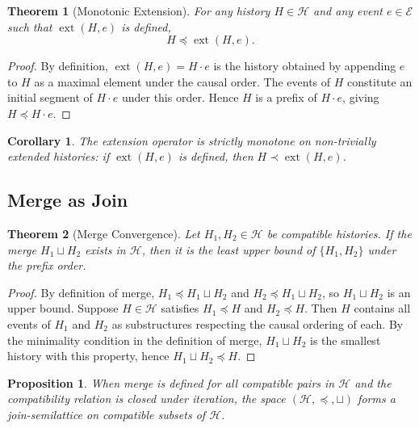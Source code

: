 \documentclass[12pt]{article}
\newtheorem{proposition}{Proposition}
\newtheorem{theorem}{Theorem}
\newtheorem{corollary}{Corollary}
\begin{document}
\begin{theorem}[Monotonic Extension]
\label{thm:monotone}
For any history $H \in \mathcal{H}$ and any event $e \in \mathcal{E}$ such that
$\operatorname{ext}(H, e)$ is defined,
\[
H \preceq \operatorname{ext}(H, e).
\]
\end{theorem}

\begin{proof}
By definition, $\operatorname{ext}(H, e) = H \cdot e$ is the history obtained by appending $e$
to $H$ as a maximal element under the causal order. The events of $H$ constitute an initial
segment of $H \cdot e$ under this order. Hence $H$ is a prefix of $H \cdot e$, giving
$H \preceq H \cdot e$.
\end{proof}

\begin{corollary}
The extension operator is strictly monotone on non-trivially extended histories: if
$\operatorname{ext}(H, e)$ is defined, then $H \prec \operatorname{ext}(H, e)$.
\end{corollary}

\subsection{Merge as Join}

\begin{theorem}[Merge Convergence]
\label{thm:merge}
Let $H_1, H_2 \in \mathcal{H}$ be compatible histories. If the merge $H_1 \sqcup H_2$ exists
in $\mathcal{H}$, then it is the least upper bound of $\{H_1, H_2\}$ under the prefix order.
\end{theorem}

\begin{proof}
By definition of merge, $H_1 \preceq H_1 \sqcup H_2$ and $H_2 \preceq H_1 \sqcup H_2$, so
$H_1 \sqcup H_2$ is an upper bound. Suppose $H \in \mathcal{H}$ satisfies $H_1 \preceq H$ and
$H_2 \preceq H$. Then $H$ contains all events of $H_1$ and $H_2$ as substructures respecting
the causal ordering of each. By the minimality condition in the definition of merge,
$H_1 \sqcup H_2$ is the smallest history with this property, hence $H_1 \sqcup H_2 \preceq H$.
\end{proof}

\begin{proposition}
\label{prop:semilattice}
When merge is defined for all compatible pairs in $\mathcal{H}$ and the compatibility relation
is closed under iteration, the space $(\mathcal{H}, \preceq, \sqcup)$ forms a join-semilattice
on compatible subsets of $\mathcal{H}$.
\end{proposition}
\end{document}
